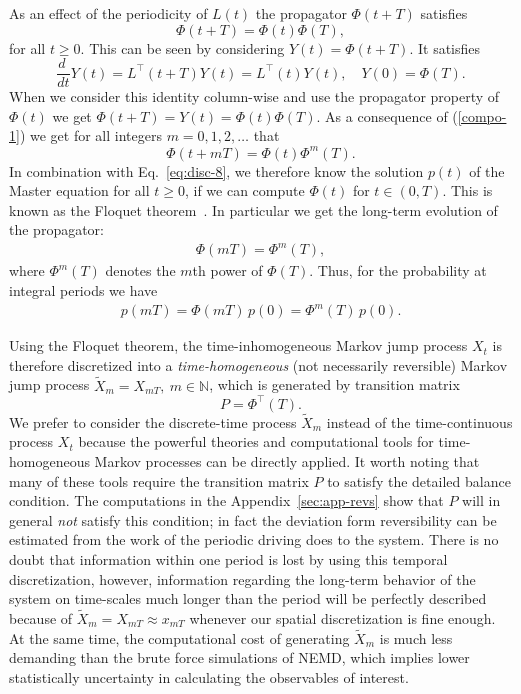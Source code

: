 \documentclass[aps, pre, preprint,unsortedaddress,a4paper,onecolumn]{revtex4}
\newcommand{\vect}[1]{#1}
\newcommand{\myphi}{\Phi}
\begin{document}
As an effect of the periodicity of $\vect L(t)$ the propagator $\myphi(t+T)$
satisfies
\begin{equation}\label{compo-1}
\myphi(t+T)=\myphi(t)\myphi(T),
\end{equation}
for all $t\ge 0$. This can be seen by considering $\vect Y(t)=\myphi(t+T)$. It satisfies
\[
\frac{d\ }{dt}\vect Y(t)=\vect L^{\top}(t+T) \vect Y(t)=\vect L^{\top}(t)\vect Y(t),\quad \vect Y(0)=\myphi(T).
\]
When we consider this identity column-wise and use the propagator property of $\myphi(t)$ we get $\myphi(t+T)=\vect Y(t)=\myphi(t)\myphi(T)$. As a consequence of (\ref{compo-1}) we get for all integers $m=0,1,2,\ldots$ that 
\begin{equation}\label{compo-2}
\myphi(t+mT)=\myphi(t)\myphi^m(T).
\end{equation}
In combination with Eq.~\eqref{eq:disc-8}, we therefore
know the solution $\vect p(t)$ of the Master equation for all $t\ge 0$,
if we can compute $\myphi(t)$ for $t\in (0,T)$.
This is known as the Floquet theorem~\cite{floquet1883equations}.
In particular we get the long-term evolution of the propagator:
\begin{align}
\label{eq:floq-13}  
\myphi(mT)=\myphi^m(T),
\end{align}
where $\myphi^m(T)$ denotes the $m$th power of $\myphi(T)$. Thus, for the probability at integral periods we have
\begin{align}
  \label{eq:floq-dynamics}
  p(mT) =  \myphi(mT)\, p(0) = \myphi^m(T)\, p(0).
\end{align}


Using the Floquet theorem, the time-inhomogeneous Markov jump process $X_t$
is therefore discretized into a \emph{time-homogeneous} (not necessarily
reversible) Markov jump process $\tilde X_{m} = X_{mT}, \ m\in\mathbb
N$, which is generated by transition matrix
\begin{equation}\label{P}
\vect P=\myphi^{\top}(T).
\end{equation}
We prefer to consider the discrete-time process $\tilde X_{m}$ instead of the time-continuous process $X_t$
because the powerful theories and
computational tools for time-homogeneous Markov processes can be directly applied. It worth noting that many of these tools require the transition matrix $P$ to satisfy the detailed balance condition. The computations in the Appendix~\ref{sec:app-revs} show that $P$ will in general \emph{not} satisfy this condition; in fact  the deviation form reversibility can be estimated from the work of the periodic driving does to the system.
There is no doubt that information within one period is lost by using this temporal
discretization, however, information regarding the long-term behavior of the system on time-scales
much longer than the period will be perfectly described because of $\tilde X_{m} = X_{mT}\approx x_{mT}$ whenever our spatial discretization is fine enough.
At the same time,
the computational cost of generating $\tilde X_{m}$ is much less demanding
than the brute force simulations of NEMD, which implies lower
statistically uncertainty in calculating the observables of interest.
\end{document}
